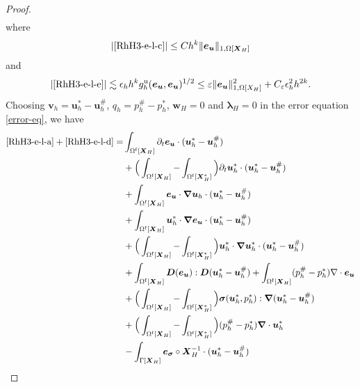 \documentclass[11pt,reqno]{amsart}
\theoremstyle{definition}
\theoremstyle{plain}
\numberwithin{theorem}{section}
\numberwithin{proposition}{section}
\numberwithin{lemma}{section}
\numberwithin{equation}{section}
\newcommand{\bs}[1]{\boldsymbol{#1}}
\newcommand{\uu}[1]  {{\bs{#1}} }
\newcommand{\grad}   { \uu{\nabla}    }
\newcommand{\bu}{\uu{u}}
\renewcommand{\(}{\bigl(}
\renewcommand{\)}{\bigr)}
\newcommand{\BL}[1]{{\color{blue} BL:  #1}}
\begin{document}
\begin{proof}
\begin{subequations}
\begin{align}
\end{align}
\end{subequations}
where 
\begin{align}\label{RhH3-e-l-bc}
|\eqref{RhH3-e-l-c}|
\le Ch^k\|{\bs e}_{\bs u}\|_{1,\Omega[\bs X_H]}  
\end{align}
and
\begin{align*}
|\eqref{RhH3-e-l-e}|
\lesssim
\epsilon_h h^k
g_h^{\rm u}({\bs e}_{\bs u},{\bs e}_{\bs u})^{1/2}
\le
\varepsilon\|{\bs e}_{\bs u}\|_{1,\Omega[X_H]}^2
+C_\varepsilon\epsilon_h^2h^{2k}.
\end{align*}
Choosing ${\bs v}_h={\bs u}_h^*-{\bs u}_h^\#$, $q_h=p_h^\#- p_h^*$, ${\bs w}_H=0$ and ${\bs\lambda}_H=0$ in the error equation \eqref{error-eq}, we have 
\begin{subequations}\label{ep-eq-a-m}
\begin{align}
\eqref{RhH3-e-l-a}+\eqref{RhH3-e-l-d} 
= & \int_{\Omega^{\rm f}[\bs X_H]} \partial_t {\bs e}_{\bs u} \cdot ({\bs u}_h^*-{\bs u}_h^\#) \label{ep-eq-a}\\
& + \Big( \int_{\Omega^{\rm f}[\bs X_H]} - \int_{\Omega^{\rm f}[\bs X_H^*]} \Big) \partial_t {\bs u}_h^* \cdot ({\bs u}_h^*-{\bs u}_h^\#) \label{ep-eq-b}\\
& + \int_{\Omega^{\rm f}[\bs X_H]} {\bs e}_{\bs u} \cdot \grad \bu_h \cdot ({\bs u}_h^*-{\bs u}_h^\#) \label{ep-eq-c}\\
& + \int_{\Omega^{\rm f}[\bs X_H]} {\bs u}_h^* \cdot \grad {\bs e}_{\bs u} \cdot ({\bs u}_h^*-{\bs u}_h^\#) \label{ep-eq-d}\\
& + \Big( \int_{\Omega^{\rm f}[\bs X_H]} - \int_{\Omega^{\rm f}[\bs X_H^*]} \Big) {\bs u}_h^* \cdot \grad {\bs u}_h^* \cdot ({\bs u}_h^*-{\bs u}_h^\#)\label{ep-eq-e}\\
&
+ \int_{\Omega^{\rm f}[\bs X_H]} \bs D({\bs e}_{\bs u}): \bs D({\bs u}_h^*-{\bs u}_h^\#) 
+ \int_{\Omega^{\rm f}[\bs X_H]} (p_h^\#- p_h^*) \nabla\cdot  {\bs e}_{\bs u}  \label{ep-eq-f}\\ 
& + \Big(\int_{\Omega^{\rm f}[\bs X_H]} -\int_{\Omega^{\rm f}[\bs X_H^*]} \Big) {\bs \sigma}(\bu_h^*,p_h^*): \grad ({\bs u}_h^*-{\bs u}_h^\#) 
\label{ep-eq-g} \\
& + \Big( \int_{\Omega^{\rm f}[\bs X_H]} - \int_{\Omega^{\rm f}[\bs X_H^*]} \Big) (p_h^\#- p_h^*) \grad\cdot \bu_h^* \label{ep-eq-h}\\
& - \int_{\Gamma[\bs X_H]} {\bs e}_{{\bs\sigma}}\circ {\bs X}_H^{-1} \cdot ({\bs u}_h^*-{\bs u}_h^\#)  \label{ep-eq-i}\\

\end{align}
\end{subequations}
\end{proof}
\end{document}
